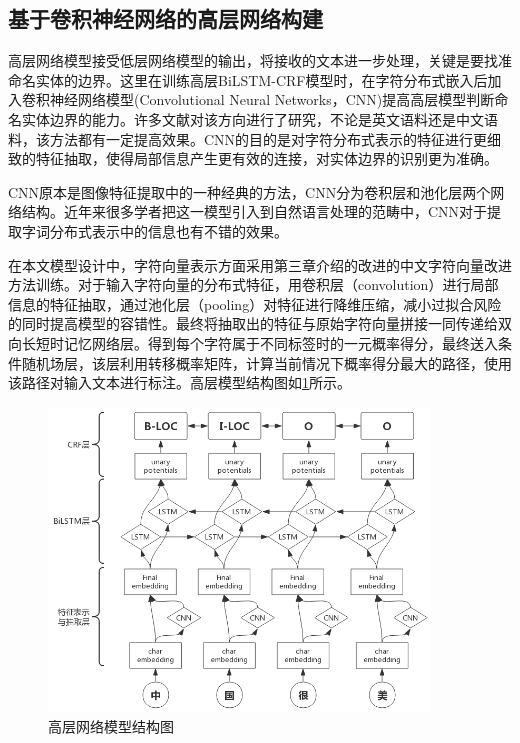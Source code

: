 \documentclass[winfonts,master,oneside,nobackinfo]{njuthesis}
\begin{document}
\subsection{基于卷积神经网络的高层网络构建}

高层网络模型接受低层网络模型的输出，将接收的文本进一步处理，关键是要找准命名实体的边界。这里在训练高层BiLSTM-CRF模型时，在字符分布式嵌入后加入卷积神经网络模型(Convolutional Neural Networks，CNN)提高高层模型判断命名实体边界的能力。许多文献对该方向进行了研究\cite{Ma,kang}，不论是英文语料\cite{Zenan}还是中文语料\cite{Yaozong}，该方法都有一定提高效果。CNN的目的是对字符分布式表示的特征进行更细致的特征抽取，使得局部信息产生更有效的连接，对实体边界的识别更为准确。

CNN原本是图像特征提取中的一种经典的方法，CNN分为卷积层和池化层两个网络结构。近年来很多学者把这一模型引入到自然语言处理的范畴中，CNN对于提取字词分布式表示中的信息也有不错的效果。

在本文模型设计中，字符向量表示方面采用第三章介绍的改进的中文字符向量改进方法训练。对于输入字符向量的分布式特征，用卷积层（convolution）进行局部信息的特征抽取，通过池化层（pooling）对特征进行降维压缩，减小过拟合风险的同时提高模型的容错性。最终将抽取出的特征与原始字符向量拼接一同传递给双向长短时记忆网络层。得到每个字符属于不同标签时的一元概率得分，最终送入条件随机场层，该层利用转移概率矩阵，计算当前情况下概率得分最大的路径，使用该路径对输入文本进行标注。高层模型结构图如\ref{high-level}所示。

\begin{figure}[h]
\centering
\includegraphics[width=0.9\textwidth]{./figure/CNN辅助.jpg}
\caption{高层网络模型结构图}
\label{high-level}
\end{figure}
\end{document}
